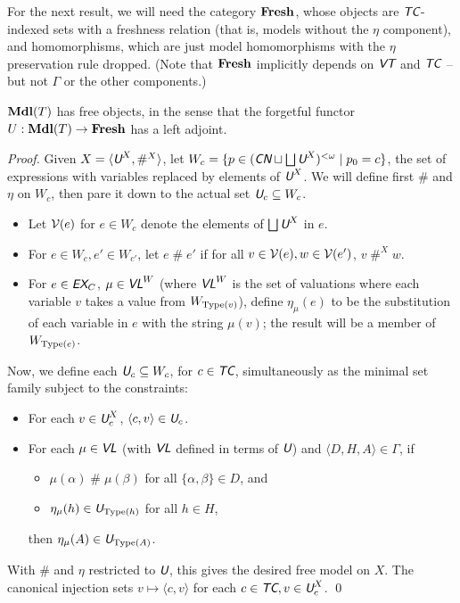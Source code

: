 \documentclass[runningheads,a4paper]{llncs}
\newcommand{\cn}{\textit{\textsf{CN}}} %
\newcommand{\ec}{\textit{\textsf{EX}}_C} %
\newcommand{\tc}{\textit{\textsf{TC}}} %
\newcommand{\vt}{\textit{\textsf{VT}}} %
\newcommand{\vl}{\textit{\textsf{VL}}} %
\newcommand{\uv}{\textit{\textsf{U}}} %
\newcommand{\ang}[1]{\langle#1\rangle}
\newcommand{\type}{{\rm Type}}
\newcommand{\fresh}{\mathbin{\#}}
\begin{document}
For the next result, we will need the category $\bf Fresh$, whose objects are $\tc$-indexed sets with a freshness relation (that is, models without the $\eta$ component), and homomorphisms, which are just model homomorphisms with the $\eta$ preservation rule dropped. (Note that $\bf Fresh$ implicitly depends on $\vt$ and $\tc$ -- but not $\Gamma$ or the other components.)

\begin{theorem}\label{thm:freemod}
${\bf Mdl}(T)$ has free objects, in the sense that the forgetful functor $U:{\bf Mdl}(T)\to{\bf Fresh}$ has a left adjoint.
\end{theorem}
\begin{proof}
Given $X=\ang{\uv^X,\fresh^X}$, let $W_c=\{p\in(\cn\sqcup\bigsqcup\uv^X)^{<\omega}\mid p_0=c\}$, the set of expressions with variables replaced by elements of $\uv^X$. We will define first $\fresh$ and $\eta$ on $W_c$, then pare it down to the actual set $\uv_c\subseteq W_c$.
\begin{itemize}
  \item Let ${\cal V}(e)$ for $e\in W_c$ denote the elements of $\bigsqcup\uv^X$ in $e$.
  \item For $e\in W_c,e'\in W_{c'}$, let $e\fresh e'$ if for all $v\in{\cal V}(e),w\in{\cal V}(e')$, $v\fresh^X w$.
  \item For $e\in\ec$, $\mu\in\vl^W$ (where $\vl^W$ is the set of valuations where each variable $v$ takes a value from $W_{\type(v)}$), define $\eta_\mu(e)$ to be the substitution of each variable in $e$ with the string $\mu(v)$; the result will be a member of $W_{\type(e)}$.
\end{itemize}

Now, we define each $\uv_c\subseteq W_c$, for $c\in\tc$, simultaneously as the minimal set family subject to the constraints: 
\begin{itemize}
  \item For each $v\in\uv^X_c$, $\ang{c,v}\in\uv_c$.
  \item For each $\mu\in\vl$ (with $\vl$ defined in terms of $\uv$) and $\ang{D,H,A}\in\Gamma$, if
  \begin{itemize}
    \item $\mu(\alpha)\fresh\mu(\beta)$ for all $\{\alpha,\beta\}\in D$, and
    \item $\eta_\mu(h)\in\uv_{\type(h)}$ for all $h\in H$,
  \end{itemize}
  then $\eta_\mu(A)\in\uv_{\type(A)}$.
\end{itemize}

With $\fresh$ and $\eta$ restricted to $\uv$, this gives the desired free model on $X$. The canonical injection sets $v\mapsto\ang{c,v}$ for each $c\in\tc,v\in\uv^X_c$.
\qed\end{proof}
\end{document}
